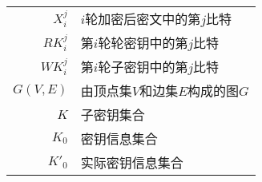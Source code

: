 \begin{symbollist}
\label{chap:symb}

\begin{longtable}{rl}
 $X^j_i$ & $i$轮加密后密文中的第$j$比特 \\
 $RK^j_i$ & 第$i$轮轮密钥中的第$j$比特 \\
 $WK^j_i$ & 第$i$轮子密钥中的第$j$比特 \\
 $G(V,E)$ & 由顶点集$V$和边集$E$构成的图$G$ \\
 $K$ & 子密钥集合 \\
 $K_0$ & 密钥信息集合 \\
 $K'_0$ & 实际密钥信息集合 \\
\end{longtable}
\end{symbollist}
